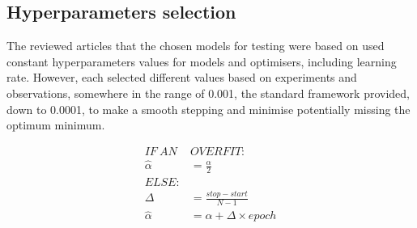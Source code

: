 \subsection{Hyperparameters selection} \label{subsec:l-rate}
%
The reviewed articles that the chosen models for testing were based on used constant hyperparameters values for models and optimisers, including learning rate.
However, each selected different values based on experiments and observations, somewhere in the range of 0.001, the standard framework provided, down to 0.0001, to make a smooth stepping and minimise potentially missing the optimum minimum.

%
\begin{equation}
  \begin{split}
      IF \ AN \ & OVERFIT: \\
      \hat{\alpha} &= \frac{\alpha }{2} \\
      ELSE: & \\
      \Delta &= \frac{stop - start}{N-1} \\
      \hat{\alpha} &= \alpha + \Delta \times epoch \\
      \label{eq:scheduler}
  \end{split}
\end{equation}
